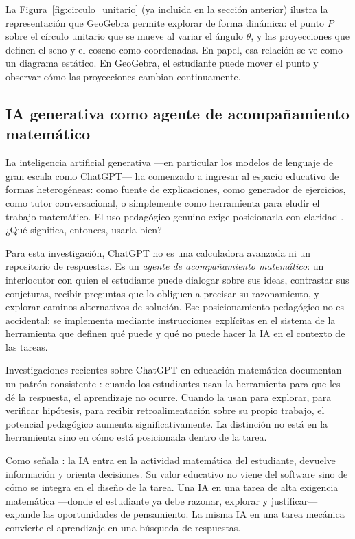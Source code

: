 La Figura~\ref{fig:circulo_unitario} (ya incluida en la sección anterior) ilustra la representación que GeoGebra permite explorar de forma dinámica: el punto $P$ sobre el círculo unitario que se mueve al variar el ángulo $\theta$, y las proyecciones que definen el seno y el coseno como coordenadas. En papel, esa relación se ve como un diagrama estático. En GeoGebra, el estudiante puede mover el punto y observar cómo las proyecciones cambian continuamente.

\subsection{IA generativa como agente de acompañamiento matemático}

La inteligencia artificial generativa —en particular los modelos de lenguaje de gran escala como ChatGPT— ha comenzado a ingresar al espacio educativo de formas heterogéneas: como fuente de explicaciones, como generador de ejercicios, como tutor conversacional, o simplemente como herramienta para eludir el trabajo matemático. El uso pedagógico genuino exige posicionarla con claridad \parencite{castillodelpezoUseArtificialIntelligence2024}. ¿Qué significa, entonces, usarla bien?

Para esta investigación, ChatGPT no es una calculadora avanzada ni un repositorio de respuestas. Es un \emph{agente de acompañamiento matemático}: un interlocutor con quien el estudiante puede dialogar sobre sus ideas, contrastar sus conjeturas, recibir preguntas que lo obliguen a precisar su razonamiento, y explorar caminos alternativos de solución. Ese posicionamiento pedagógico no es accidental: se implementa mediante instrucciones explícitas en el sistema de la herramienta que definen qué puede y qué no puede hacer la IA en el contexto de las tareas.

Investigaciones recientes sobre ChatGPT en educación matemática documentan un patrón consistente \parencite{wardatChatGPTRevolutionaryTool2023}: cuando los estudiantes usan la herramienta para que les dé la respuesta, el aprendizaje no ocurre. Cuando la usan para explorar, para verificar hipótesis, para recibir retroalimentación sobre su propio trabajo, el potencial pedagógico aumenta significativamente. La distinción no está en la herramienta sino en cómo está posicionada dentro de la tarea.

Como señala \textcite{pepinMathematicsEducationEra2025}: la IA entra en la actividad matemática del estudiante, devuelve información y orienta decisiones. Su valor educativo no viene del software sino de cómo se integra en el diseño de la tarea. Una IA en una tarea de alta exigencia matemática —donde el estudiante ya debe razonar, explorar y justificar— expande las oportunidades de pensamiento. La misma IA en una tarea mecánica convierte el aprendizaje en una búsqueda de respuestas.

